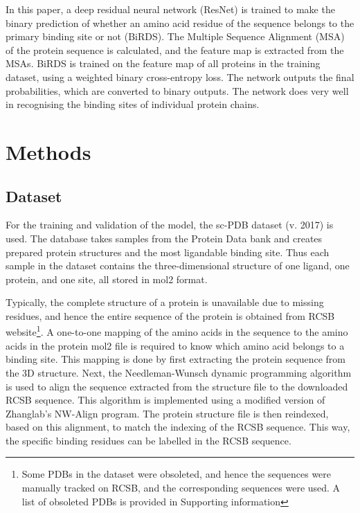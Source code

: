 \documentclass[journal=jcisd8,manuscript=article]{achemso}
\begin{document}
In this paper, a deep residual neural network (ResNet)\cite{he2016deep} is trained to make the binary prediction of whether an amino acid residue of the sequence belongs to the primary binding site or not (BiRDS). The Multiple Sequence Alignment (MSA) of the protein sequence is calculated, and the feature map is extracted from the MSAs. BiRDS is trained on the feature map of all proteins in the training dataset, using a weighted binary cross-entropy loss. The network outputs the final probabilities, which are converted to binary outputs. The network does very well in recognising the binding sites of individual protein chains.

\section{Methods}
\subsection{Dataset}
\quad For the training and validation of the model, the sc-PDB\cite{desaphy2015sc} dataset (v. 2017) is used. The database takes samples from the Protein Data bank\cite{berman2000protein,berman2003announcing} and creates prepared protein structures and the most ligandable binding site. Thus each sample in the dataset contains the three-dimensional structure of one ligand, one protein, and one site, all stored in mol2 format.

\newpage
Typically, the complete structure of a protein is unavailable due to missing residues, and hence the entire sequence of the protein is obtained from RCSB \cite{burley2021rcsb} website\footnote{Some PDBs in the dataset were obsoleted, and hence the sequences were manually tracked on RCSB, and the corresponding sequences were used. A list of obsoleted PDBs is provided in Supporting information}. A one-to-one mapping of the amino acids in the sequence to the amino acids in the protein mol2 file is required to know which amino acid belongs to a binding site. This mapping is done by first extracting the protein sequence from the 3D structure. Next, the Needleman-Wunsch dynamic programming algorithm\cite{needleman1970general} is used to align the sequence extracted from the structure file to the downloaded RCSB sequence. This algorithm is implemented using a modified version of Zhanglab's NW-Align program\cite{NWAlign}. The protein structure file is then reindexed, based on this alignment, to match the indexing of the RCSB sequence. This way, the specific binding residues can be labelled in the RCSB sequence.
\end{document}
